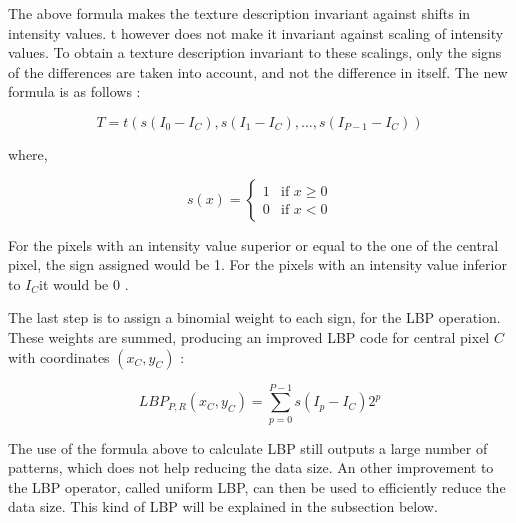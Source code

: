 \vspace{\baselineskip}
\noindent The above formula makes the texture description invariant against shifts in intensity values. t however does not make it invariant against scaling of intensity values. To obtain a texture description invariant to these scalings, only the signs of the differences are taken into account, and not the difference in itself. The new formula is as follows \cite{GAN08}:
\newline

\begin{equation}
   T = t(s(I_0 - I_C), s(I_1 - I_C), ..., s(I_{P-1} - I_C))
\end{equation}

\noindent where,
\newline

\begin{equation}
s(x) = \left\{
    \begin{array}{ll}
        1 & \mbox{if } x\geq0 \\
        0 & \mbox{if } x < 0
    \end{array}
\right.
\end{equation}

\vspace{\baselineskip}
\noindent For the pixels with an intensity value superior or equal to the one of the central pixel, the sign assigned would be 1. For the pixels with an intensity value inferior to $I_C$it  would be 0 \cite{GAN08}.
\newline

\noindent The last step is to assign a binomial weight to each sign, for the LBP operation. These weights are summed, producing an improved LBP code for central pixel $ C $ with coordinates $ (x_C,y_C) $ \cite{GAN08}:
\newline

\begin{equation}
   LBP_{P,R}(x_C,y_C) = \sum_{p = 0}^{P-1} s(I_p - I_C)2^p
\end{equation}

\vspace{\baselineskip}
\noindent The use of the formula above to calculate LBP still outputs a large number of patterns, which does not help reducing the data size. An other improvement to the LBP operator, called uniform LBP, can then be used to efficiently reduce the data size. This kind of LBP will be explained in the subsection below.
\newline

